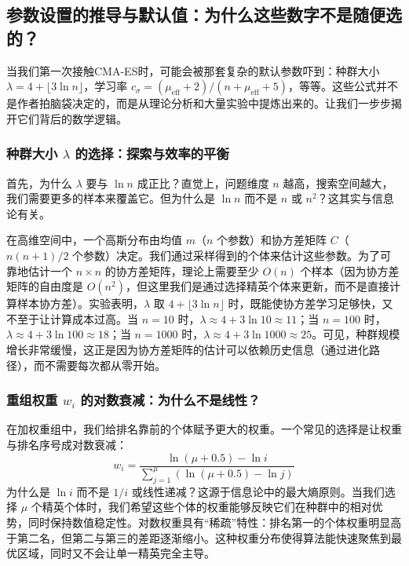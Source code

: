 \documentclass[lang=cn,zihao=-4,a4paper,fontset=windows]{beautybook}
\begin{document}
\subsection{参数设置的推导与默认值：为什么这些数字不是随便选的？}

当我们第一次接触CMA-ES时，可能会被那套复杂的默认参数吓到：种群大小 $\lambda = 4 + \lfloor 3\ln n \rfloor$，学习率 $c_\sigma = (\mu_{\text{eff}}+2)/(n+\mu_{\text{eff}}+5)$，等等。这些公式并不是作者拍脑袋决定的，而是从理论分析和大量实验中提炼出来的。让我们一步步揭开它们背后的数学逻辑。

\subsubsection{种群大小 $\lambda$ 的选择：探索与效率的平衡}

首先，为什么 $\lambda$ 要与 $\ln n$ 成正比？直觉上，问题维度 $n$ 越高，搜索空间越大，我们需要更多的样本来覆盖它。但为什么是 $\ln n$ 而不是 $n$ 或 $n^2$？这其实与信息论有关。

在高维空间中，一个高斯分布由均值 $m$（$n$ 个参数）和协方差矩阵 $C$（$n(n+1)/2$ 个参数）决定。我们通过采样得到的个体来估计这些参数。为了可靠地估计一个 $n \times n$ 的协方差矩阵，理论上需要至少 $O(n)$ 个样本（因为协方差矩阵的自由度是 $O(n^2)$，但这里我们是通过选择精英个体来更新，而不是直接计算样本协方差）。实验表明，$\lambda$ 取 $4 + \lfloor 3\ln n \rfloor$ 时，既能使协方差学习足够快，又不至于让计算成本过高。当 $n=10$ 时，$\lambda \approx 4+3\ln 10 \approx 11$；当 $n=100$ 时，$\lambda \approx 4+3\ln 100 \approx 18$；当 $n=1000$ 时，$\lambda \approx 4+3\ln 1000 \approx 25$。可见，种群规模增长非常缓慢，这正是因为协方差矩阵的估计可以依赖历史信息（通过进化路径），而不需要每次都从零开始。

\subsubsection{重组权重 $w_i$ 的对数衰减：为什么不是线性？}

在加权重组中，我们给排名靠前的个体赋予更大的权重。一个常见的选择是让权重与排名序号成对数衰减：
\[
w_i = \frac{\ln(\mu+0.5) - \ln i}{\sum_{j=1}^{\mu} (\ln(\mu+0.5) - \ln j)}
\]
为什么是 $\ln i$ 而不是 $1/i$ 或线性递减？这源于信息论中的最大熵原则。当我们选择 $\mu$ 个精英个体时，我们希望这些个体的权重能够反映它们在种群中的相对优势，同时保持数值稳定性。对数权重具有“稀疏”特性：排名第一的个体权重明显高于第二名，但第二与第三的差距逐渐缩小。这种权重分布使得算法能快速聚焦到最优区域，同时又不会让单一精英完全主导。
\end{document}
